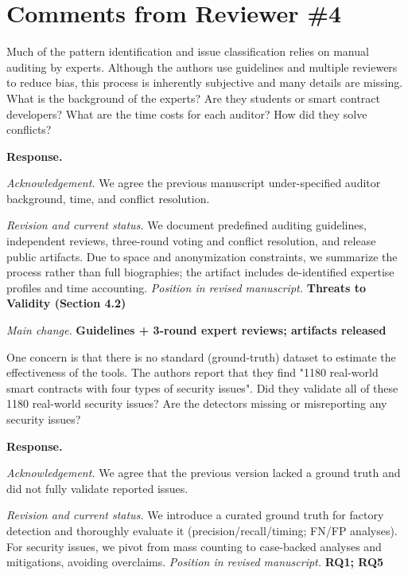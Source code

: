 \documentclass[acmsmall]{acmart}
\begin{document}
	\newpage
	\section{Comments from Reviewer \#4}

	\begin{tcolorbox}
		[commentbox,title=Reviewer \#4 -- Comment 1] Much of the pattern identification and issue classification
		relies on manual auditing by experts. Although the authors use guidelines and multiple
		reviewers to reduce bias, this process is inherently subjective and many details are missing.
		What is the background of the experts? Are they students or smart contract developers? What
		are the time costs for each auditor? How did they solve conflicts?
	\end{tcolorbox}

	\noindent
	\textbf{Response.}

	\textit{Acknowledgement.} We agree the previous manuscript under-specified auditor background, time,
	and conflict resolution.

	\textit{Revision and current status.} We document predefined auditing guidelines, independent
	reviews, three-round voting and conflict resolution, and release public artifacts. Due to space and
	anonymization constraints, we summarize the process rather than full biographies; the artifact includes
	de-identified expertise profiles and time accounting. \textit{Position in revised manuscript.} {\color{red}\textbf{Threats to Validity (Section 4.2)}}

	\textit{Main change.} {\color{blue}\textbf{Guidelines + 3-round expert reviews; artifacts released}}

	\begin{tcolorbox}
		[commentbox,title=Reviewer \#4 -- Comment 2] One concern is that there is no standard (ground-truth)
		dataset to estimate the effectiveness of the tools. The authors report that they find "1180 real-world
		smart contracts with four types of security issues". Did they validate all of these 1180 real-world
		security issues? Are the detectors missing or misreporting any security issues?
	\end{tcolorbox}

	\noindent
	\textbf{Response.}

	\textit{Acknowledgement.} We agree that the previous version lacked a ground truth and did not
	fully validate reported issues.

	\textit{Revision and current status.} We introduce a curated ground truth for factory detection and
	thoroughly evaluate it (precision/recall/timing; FN/FP analyses). For security issues, we pivot
	from mass counting to case-backed analyses and mitigations, avoiding overclaims. \textit{Position
	in revised manuscript.} {\color{red}\textbf{RQ1; RQ5}}
\end{document}
